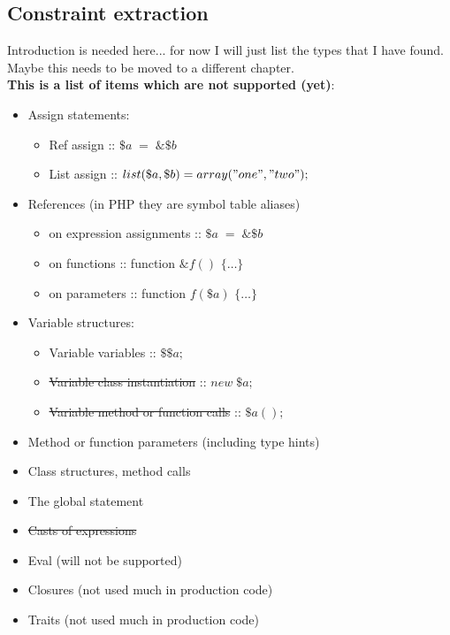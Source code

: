 \documentclass[../main.tex]{subfiles}
\begin{document}
    \subsection{Constraint extraction}
       
    Introduction is needed here... for now I will just list the types that I have found.
    Maybe this needs to be moved to a different chapter.
    \\
    \textbf{This is a list of items which are not supported (yet)}:

    \begin{itemize}
        \item Assign statements:
        \begin{itemize}
            \item Ref assign :: $\$a \; = \; \&\$b$
            \item List assign :: $list(\$a, \$b) = array("one", "two");$
        \end{itemize}
        
        \item References (in PHP they are symbol table aliases)
        \begin{itemize}
            \item on expression assignments :: $\$a \; = \; \&\$b$
            \item on functions :: function $\&f()$ $\{ \dots \}$
            \item on parameters :: function $f(\$a)$ $\{ \dots \}$             
        \end{itemize}

        \item Variable structures:
        \begin{itemize}
            \item Variable variables :: $\$\$a;$
            \item \sout{Variable class instantiation} :: $new \; \$a;$
            \item \sout{Variable method or function calls} :: $\$a();$
        \end{itemize}
        
        \item Method or function parameters (including type hints)
        \item Class structures, method calls
        
        \item The global statement
        
        \item \sout{Casts of expressions}

        \item Eval (will not be supported)        
        \item Closures (not used much in production code)
        \item Traits (not used much in production code)

        
        
    \end{itemize}
\end{document}
